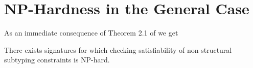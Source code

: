 \section{NP-Hardness in the General Case}

As an immediate consequence of Theorem 2.1 of \cite{pratt96fi} we get

\begin{satz}
There exists signatures for which checking satisfiability of
non-structural subtyping constraints is NP-hard.
\end{satz}
